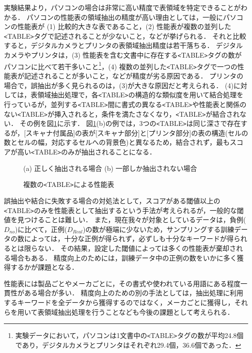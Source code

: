実験結果より，パソコンの場合は非常に高い精度で表領域を特定できることがわかる．
パソコンの性能表の領域抽出の精度が高い理由としては，一般にパソコンの性能表が (1) 比較的大きな表であること，(2) 性能表が複数の並列した\verb+<+TABLE\verb+>+タグで記述されることが少ないこと，などが挙げられる．
それと比較すると，デジタルカメラとプリンタの表領域抽出精度は若干落ちる．
デジタルカメラやプリンタは，(3) 性能表を含む文書中に存在する\verb+<+TABLE\verb+>+タグの数がパソコンに比べて若干多いこと\footnote{実験データにおいて，パソコンは1文書中の\verb+<+TABLE\verb+>+タグの数が平均24.8個であり，デジタルカメラとプリンタはそれぞれ29.4個，36.6個であった．}，(4) 複数の並列した\verb+<+TABLE\verb+>+タグで一つの性能表が記述されることが多いこと，などが精度が劣る原因である．
プリンタの場合で，誤抽出が多く見られるのは，(3)が大きな原因だと考えられる．
(4)に対しては，表領域抽出処理で，各\verb+<+TABLE\verb+>+の構造的な類似度を用いて結合処理を行っているが，並列する\verb+<+TABLE\verb+>+間に書式の異なる\verb+<+TABLE\verb+>+や性能表と関係のない\verb+<+TABLE\verb+>+が挿入されると，条件を満たさなくなり，\verb+<+TABLE\verb+>+が結合されない．
その例を図\ref{missint}に示す．
図\ref{missint}(b)の例では，3つの\verb+<+TABLE\verb+>+は同じ深さで存在するが，[スキャナ付属品]の表が[スキャナ部分]と[プリンタ部分]の表の構造(セルの数とセルの幅，対応するセルへの背景色)と異なるため，結合されず，最もスコアが高い\verb+<+TABLE\verb+>+のみが抽出されることになる．
\begin{figure}
\begin{center}
(a) 正しく抽出される場合 \hspace{30mm}(b) 一部しか抽出されない場合
\end{center}
\vspace{-3mm}
\caption{複数の\verb+<+TABLE\verb+>+による性能表}
\label{missint}
\end{figure}

誤抽出や結合に失敗する場合の対処法として，スコアがある閾値以上の\verb+<+TABLE\verb+>+のみを性能表として抽出するという手法が考えられるが，一般的な閾値を見つけることは難しい．
また，現在我々が対象としているデータは，負例($D_{no}$)に比べて，正例($D_{Real}$)の数が極端に少ないため，サンプリングする訓練データの数によっては，十分な正例が得られず，必ずしも十分なキーワードが得られるとは限らない．
その結果，設定した閾値によっては多くの性能表が棄却される場合もある．
精度向上のためには，訓練データ中の正例の数をいかに多く獲得するかが課題となる．

性能表には製品ごとやメーカごとに，その書式や使われている用語にある程度一貫性がある場合が多い．
精度向上のための別の手法としては，抽出処理に利用するキーワードを全データから獲得するのではなく，メーカごとに獲得し，それらを用いて表領域抽出処理を行うことなども今後の課題として考えられる．

